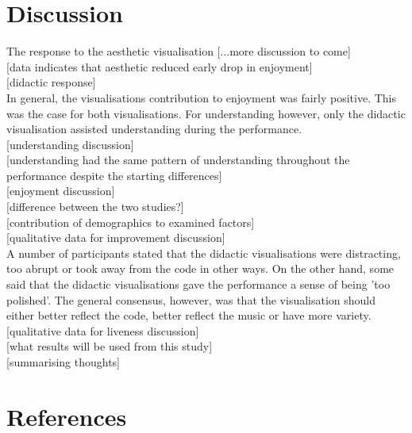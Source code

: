 \documentclass{article}
\begin{document}
\section{Discussion}

The response to the aesthetic visualisation [...more discussion to come]\\

[data indicates that aesthetic reduced early drop in enjoyment]\\

[didactic response]\\

In general, the visualisations contribution to enjoyment was fairly positive. This was the case for both visualisations. For understanding however, only the didactic visualisation assisted understanding during the performance.\\

[understanding discussion]\\

[understanding had the same pattern of understanding throughout the performance despite the starting differences]\\

[enjoyment discussion]\\

[difference between the two studies?]\\

[contribution of demographics to examined factors]\\

[qualitative data for improvement discussion]\\


A number of participants stated that the didactic visualisations were distracting, too abrupt or took away from the code in other ways. On the other hand, some said that the didactic visualisations gave the performance a sense of being 'too polished'. The general consensus, however, was that the visualisation should either better reflect the code, better reflect the music or have more variety.\\

[qualitative data for liveness discussion]\\

[what results will be used from this study]\\

[summarising thoughts]\\

\section{References}
\end{document}
